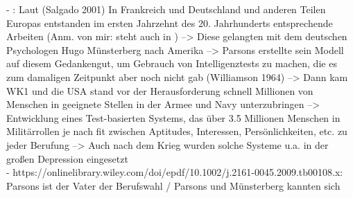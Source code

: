 - \cite[S. 1]{su:2015}: Laut (Salgado 2001) In Frankreich und Deutschland und anderen Teilen Europas entstanden im ersten Jahrzehnt des 20. Jahrhunderts entsprechende Arbeiten (Anm. von mir: steht auch in \cite{kevles:1968}) --> Diese gelangten mit dem deutschen Psychologen Hugo Münsterberg nach Amerika --> Parsons erstellte sein Modell auf diesem Gedankengut, um Gebrauch von Intelligenztests zu machen, die es zum damaligen Zeitpunkt aber noch nicht gab (Williamson 1964) --> Dann kam WK1 und die USA stand vor der Herausforderung schnell Millionen von Menschen in geeignete Stellen in der Armee und Navy unterzubringen --> Entwicklung eines Test-basierten Systems, das über 3.5 Millionen Menschen in Militärrollen je nach fit zwischen Aptitudes, Interessen, Persönlichkeiten, etc. zu jeder Berufung  \cite{kevles:1968} --> Auch nach dem Krieg wurden solche Systeme u.a. in der großen Depression eingesetzt \\
- https://onlinelibrary.wiley.com/doi/epdf/10.1002/j.2161-0045.2009.tb00108.x: Parsons ist der Vater der Berufswahl / Parsons und Münsterberg kannten sich

